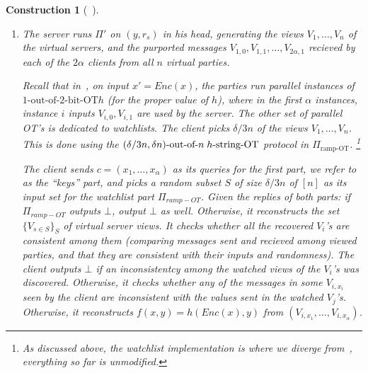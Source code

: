 \documentclass[a4paper]{article}
\newtheorem{construction}{Construction}
\newcommand{\OT}[2]{#1\text{-out-of-}#2\text{-bit-OT}}
\newcommand{\sOT}[3]{#1\text{-out-of-}#2\text{\;$#3$-string-OT}}
\begin{document}
\begin{construction}[~\cite{IKOPS11}]
\begin{enumerate}
	The protocol has the following security guarantees.
	It is perfectly correct against any adversary corrupting
	the sender and at most $\delta n$ of the servers, and any number of the clients. Such protocols exist for all $\delta<1/3$.
	Also, we will $n$ to satisfy $2\lfloor \delta/3 n\rfloor < \lfloor \delta n\rfloor$ (from now on we omit $\lfloor\;\rfloor$ for brevity). Let us fix $\delta = 1/4$, which imposes that $n > 12$.
	
	If the sender is honest, $\Pi_{HM}$ is perfectly private against \emph{semi-honest} adversaries corrupting any subset of clients, and up to $\delta n$ of the virtual servers. 
	Consider~\cite{BGW88} as such a protocol with CC linear in the size of the encoding circuit, which is an optimized variant of~\cite{BGW88}.
	\item The server runs $\Pi'$ on $(y,r_s)$ in his head, generating the views $V_1,\ldots,V_n$ of the virtual servers, and the purported messages $V_{1,0},V_{1,1},\ldots,V_{2\alpha,1}$ recieved by each of the $2\alpha$ clients from all $n$ virtual parties.
	
	Recall that in~\cite{IKOPS11}, on input $x'=Enc(x)$, the parties run
	parallel instances of $\OT{1}{2}{h}$ (for the proper value of $h$), where in the first $\alpha$ instances, instance $i$ inputs $V_{i,0},V_{i,1}$ are used by the server. 
	The other set of parallel OT's is dedicated to watchlists.
	The client picks $\delta/3 n$  of the views $V_1,\ldots,V_n$.
	This is done using the $\sOT{(\delta/3n ,\delta n)}{n}{h}$ protocol in $\Pi_{\text{ramp-OT}}$. 
	\footnote{As discussed above, the watchlist implementation is where we diverge from~\cite{IKOPS11}, everything so far is unmodified.}
	
	The client sends $c=(x_1,\ldots,x_\alpha)$ as its queries for the first part, we refer to as the ``keys'' part, and picks a random subset $S$ of size $\delta/3 n$ of $[n]$ as its input set for the watchlist part $\Pi_{ramp-OT}$.
	Given the replies of both parts: if $\Pi_{ramp-OT}$ outputs $\bot$, output $\bot$ as well. Otherwise, it reconstructs the set $\{V_{s\in S}\}_S$ of virtual server views.
	It checks whether all the recovered $V_i$'s are consistent among them (comparing messages sent and recieved among viewed parties, and that they are consistent with their inputs and randomness).
	The client outputs $\bot$ if an inconsistentcy among the watched views of the $V_i$'s was discovered. Otherwise, it checks whether any of the messages in some $V_{i,x_i}$ seen by the client are inconsistent with the values sent in the watched $V_j$'s. Otherwise, it reconstructs $f(x,y)=h(Enc(x),y)$ from $(V_{i,x_1},\ldots,V_{i,x_\alpha})$. 
	
	\end{enumerate}
\end{construction}	
\end{document}
